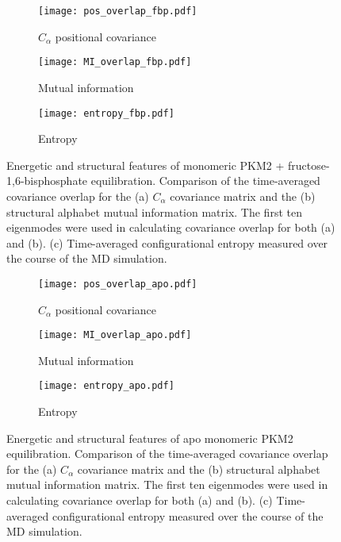 \documentclass[11pt]{article}
\begin{document}
\begin{figure}[!ht]
\centering
\begin{subfigure}[b]{.4\linewidth}
    \centering
    \texttt{[image: pos\_overlap\_fbp.pdf]}
    \caption{$C_\alpha$ positional covariance}\label{fig:4a}
  \end{subfigure}%
  \begin{subfigure}[b]{.4\linewidth}
    \centering
    \texttt{[image: MI\_overlap\_fbp.pdf]}
    \caption{Mutual information}\label{fig:3b}
  \end{subfigure}%
  \begin{subfigure}[b]{.4\linewidth}
    \centering
    \texttt{[image: entropy\_fbp.pdf]}
    \caption{Entropy}\label{fig:3b}
  \end{subfigure}%
\caption{Energetic and structural features of monomeric PKM2 + fructose-1,6-bisphosphate equilibration. Comparison of the time-averaged covariance overlap for the (a) $C_\alpha$ covariance matrix and the (b) structural alphabet mutual information matrix. The first ten eigenmodes were used in calculating covariance overlap for both (a) and (b). (c) Time-averaged configurational entropy measured over the course of the MD simulation.}\label{fig:2}
\end{figure}
\begin{figure}[!ht]
\centering
\begin{subfigure}[b]{.4\linewidth}
    \centering
    \texttt{[image: pos\_overlap\_apo.pdf]}
    \caption{$C_\alpha$ positional covariance}\label{fig:4a}
  \end{subfigure}%
  \begin{subfigure}[b]{.4\linewidth}
    \centering
    \texttt{[image: MI\_overlap\_apo.pdf]}
    \caption{Mutual information}\label{fig:3b}
  \end{subfigure}%
  \begin{subfigure}[b]{.4\linewidth}
    \centering
    \texttt{[image: entropy\_apo.pdf]}
    \caption{Entropy}\label{fig:3b}
  \end{subfigure}%
\caption{Energetic and structural features of apo monomeric PKM2 equilibration. Comparison of the time-averaged covariance overlap for the (a) $C_\alpha$ covariance matrix and the (b) structural alphabet mutual information matrix. The first ten eigenmodes were used in calculating covariance overlap for both (a) and (b). (c) Time-averaged configurational entropy measured over the course of the MD simulation.}\label{fig:2}
\end{figure}
\end{document}
